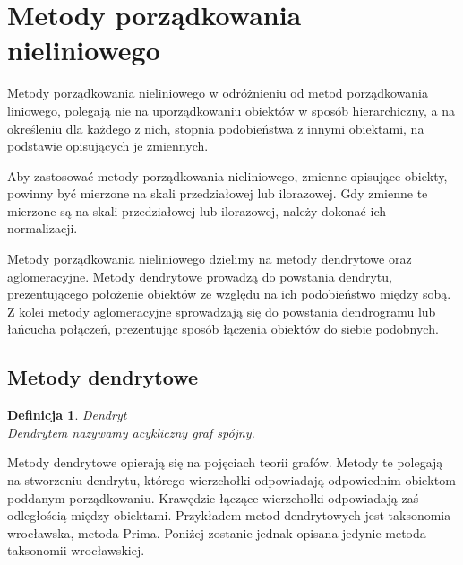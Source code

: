 \documentclass[12pt,a4paper]{report}
\newtheorem{definition}[theorem]{Definicja}
\begin{document}
\section{Metody porządkowania nieliniowego}


Metody porządkowania nieliniowego w odróżnieniu od metod porządkowania liniowego, polegają nie na uporządkowaniu obiektów w sposób hierarchiczny, a na określeniu dla każdego z nich, stopnia podobieństwa z innymi obiektami, na podstawie opisujących je zmiennych. 

Aby zastosować metody porządkowania nieliniowego, zmienne opisujące obiekty, powinny być mierzone na skali przedziałowej lub ilorazowej. Gdy zmienne te mierzone są na skali przedziałowej lub ilorazowej, należy dokonać ich normalizacji.

Metody porządkowania nieliniowego dzielimy na metody dendrytowe oraz aglomeracyjne. Metody dendrytowe prowadzą do powstania dendrytu, prezentującego położenie obiektów ze względu na ich podobieństwo między sobą. Z kolei metody aglomeracyjne sprowadzają się do powstania dendrogramu lub łańcucha połączeń, prezentując sposób łączenia obiektów do siebie podobnych. 

\subsection{Metody dendrytowe}

\begin{definition}{Dendryt \cite[Rozdział 2.3]{panek2013}}\\
Dendrytem nazywamy acykliczny graf spójny.
\end{definition}

Metody dendrytowe opierają się na pojęciach teorii grafów. Metody te polegają na stworzeniu dendrytu, którego wierzchołki odpowiadają odpowiednim obiektom poddanym porządkowaniu. Krawędzie łączące wierzchołki odpowiadają zaś odległością między obiektami. Przykładem metod dendrytowych jest taksonomia wrocławska, metoda Prima.   Poniżej zostanie jednak opisana jedynie metoda taksonomii wrocławskiej.  
\end{document}
